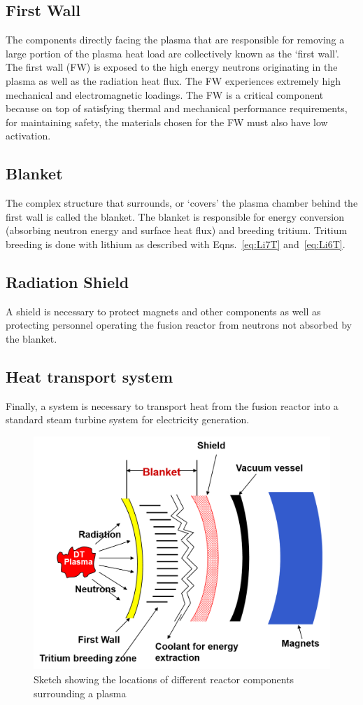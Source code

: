 \documentclass[11pt]{report} %
\begin{document}
\subsection{First Wall}
The components directly facing the plasma that are responsible for removing a large portion of the plasma heat load are collectively known as the `first wall'. The first wall (FW) is exposed to the high energy neutrons originating in the plasma as well as the radiation heat flux. The FW experiences extremely high mechanical and electromagnetic loadings. The FW is a critical component because on top of satisfying thermal and mechanical performance requirements, for maintaining safety, the materials chosen for the FW must also have low activation.

\subsection{Blanket}
The complex structure that surrounds, or `covers' the plasma chamber behind the first wall is called the blanket. The blanket is responsible for energy conversion (absorbing neutron energy and surface heat flux) and breeding tritium. Tritium breeding is done with lithium as described with Eqns.~\ref{eq:Li7T} and~\ref{eq:Li6T}.

\subsection{Radiation Shield}
A shield is necessary to protect magnets and other components as well as protecting personnel operating the fusion reactor from neutrons not absorbed by the blanket.

\subsection{Heat transport system}
Finally, a system is necessary to transport heat from the fusion reactor into a standard steam turbine system for electricity generation.
\begin{figure}
\centering
\includegraphics[width=\textwidth]{../images/reactor_components.png} 
\caption{Sketch showing the locations of different reactor components surrounding a plasma}
\label{fig:reactor_components}
\end{figure}
\end{document}

